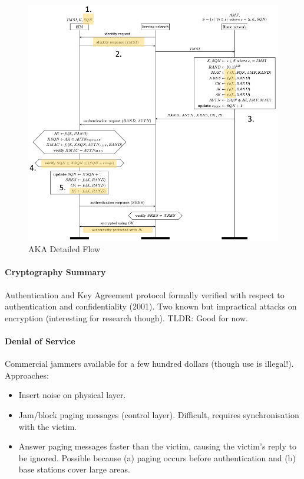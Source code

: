 \begin{figure}
	\centering
	\includegraphics[scale=0.7]{images/10-3g-aka-details.png}
	\caption{AKA Detailed Flow}
	\label{fig:3g-aka-details}
\end{figure}

\paragraph{Cryptography Summary}
Authentication and Key Agreement protocol formally verified with respect to authentication and confidentiality (2001).
Two known but impractical attacks on encryption (interesting for research though).
TLDR: Good for now.

\paragraph{Denial of Service}
Commercial jammers available for a few hundred dollars (though use is illegal!).
\\
Approaches:
\begin{itemize}
	\item Insert noise on physical layer.
	\item Jam/block paging messages (control layer). Difficult, requires synchronisation with the victim.
	\item Answer paging messages faster than the victim, causing the victim's reply to be ignored.
	Possible because (a) paging occurs before authentication and (b) base stations cover large areas.
\end{itemize}

